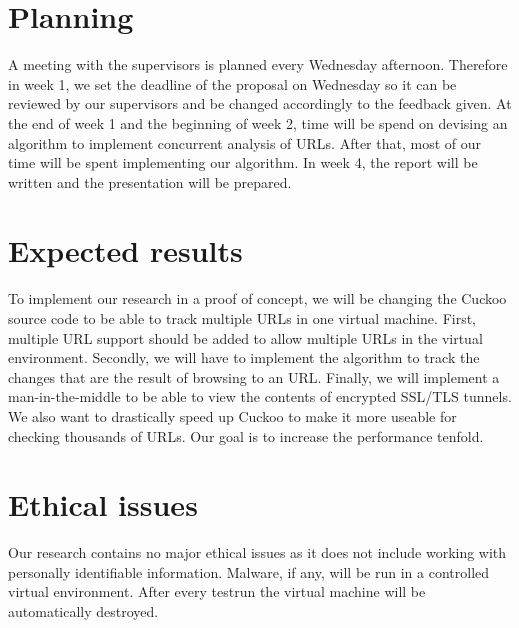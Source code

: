 \documentclass{scrartcl}
\begin{document}
\section{Planning}

A meeting with the supervisors is planned every Wednesday afternoon. Therefore in week 1, we set the deadline of the proposal on Wednesday so it can be reviewed by our supervisors and be changed accordingly to the feedback given. At the end of week 1 and the beginning of week 2, time will be spend on devising an algorithm to implement concurrent analysis of URLs. After that, most of our time will be spent implementing our algorithm. In week 4, the report will be written and the presentation will be prepared.

\section{Expected results}

To implement our research in a proof of concept, we will be changing the Cuckoo source code to be able to track multiple URLs in one virtual machine. First, multiple URL support should be added to allow multiple URLs in the virtual environment. Secondly, we will have to implement the algorithm to track the changes that are the result of browsing to an URL. Finally, we will implement a man-in-the-middle to be able to view the contents of encrypted SSL/TLS tunnels.\\

We also want to drastically speed up Cuckoo to make it more useable for checking thousands of URLs. Our goal is to increase the performance tenfold.

\section{Ethical issues}

Our research contains no major ethical issues as it does not include working with personally identifiable information. Malware, if any, will be run in a controlled virtual environment. After every testrun the virtual machine will be automatically destroyed.



\end{document}
